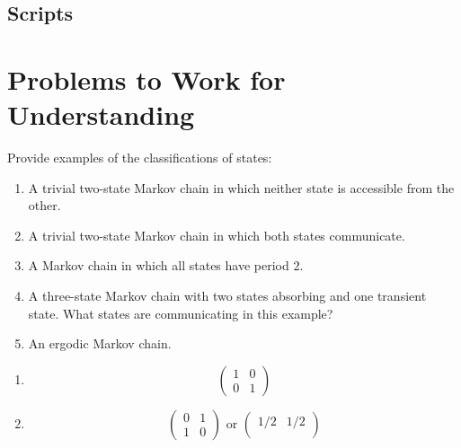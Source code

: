 \documentclass[12pt]{article}
\begin{document}
\begin{enumerate}
\subsection*{Scripts}



\hr

\section*{Problems to Work for Understanding}

\renewcommand{\theexerciseseries}{}
\renewcommand{\theexercise}{\arabic{exercise}}

\begin{exercise}
    Provide examples of the classifications of states:
    \begin{enumerate}[label=(\alph*)]
    \item
        A trivial two-state Markov chain in which neither state is
        accessible from the other.
    \item
        A trivial two-state Markov chain in which both states
        communicate.
    \item
        A Markov chain in which all states have period \( 2 \).
    \item
        A three-state Markov chain with two states absorbing and one
        transient state.  What states are communicating in this example?
    \item
        An ergodic Markov chain.
\end{enumerate}
\end{exercise}
\begin{solution}
    \begin{enumerate}[label=(\alph*)]
    \item
        \[
            \begin{pmatrix}
                1 & 0 \\
                0 & 1
            \end{pmatrix}
        \]
    \item
        \[
            \begin{pmatrix}
                0 & 1 \\
                1 & 0
            \end{pmatrix}
            \text{ or }
            \begin{pmatrix}
                1/2 & 1/2 \\

\end{pmatrix}\]
\end{enumerate}
\end{solution}
\end{enumerate}
\end{document}
